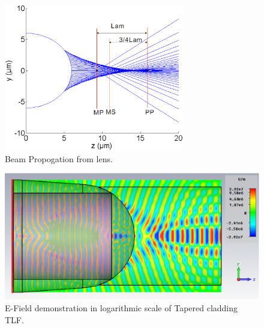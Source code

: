 \begin{figure}[!ht]
\centering
	\includegraphics[width=0.7\textwidth]{bilder/cal_min_spot}
\caption{Beam Propogation from lens.}
\label{fig:lens_spot}
\end{figure}
\begin{figure}[!ht]
	\centering
		\includegraphics[width=0.8 \textwidth]{bilder/cst_lensed_fiber_equ_efield}
		\caption{E-Field demonstration in logarithmic scale of Tapered cladding TLF.}
 		\label{fig:Tapered_cladding_efield}
\end{figure}

